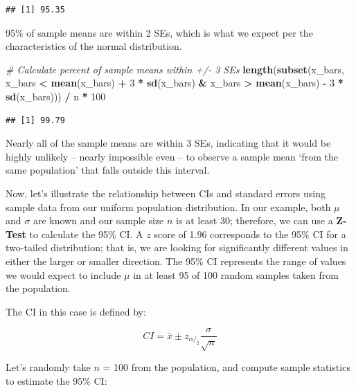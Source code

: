 \documentclass[]{book}
\newenvironment{Shaded}{\begin{snugshade}}{\end{snugshade}}
\newcommand{\CommentTok}[1]{\textcolor[rgb]{0.56,0.35,0.01}{\textit{#1}}}
\newcommand{\DecValTok}[1]{\textcolor[rgb]{0.00,0.00,0.81}{#1}}
\newcommand{\KeywordTok}[1]{\textcolor[rgb]{0.13,0.29,0.53}{\textbf{#1}}}
\newcommand{\NormalTok}[1]{#1}
\newcommand{\OperatorTok}[1]{\textcolor[rgb]{0.81,0.36,0.00}{\textbf{#1}}}
\newcommand{\StringTok}[1]{\textcolor[rgb]{0.31,0.60,0.02}{#1}}
\begin{document}
\begin{verbatim}
## [1] 95.35
\end{verbatim}

95\% of sample means are within 2 SEs, which is what we expect per the characteristics of the normal distribution.

\begin{Shaded}
\begin{Highlighting}[]
\CommentTok{# Calculate percent of sample means within +/- 3 SEs}
\KeywordTok{length}\NormalTok{(}\KeywordTok{subset}\NormalTok{(x_bars, x_bars }\OperatorTok{<}\StringTok{ }\KeywordTok{mean}\NormalTok{(x_bars) }\OperatorTok{+}\StringTok{ }\DecValTok{3} \OperatorTok{*}\StringTok{ }\KeywordTok{sd}\NormalTok{(x_bars) }\OperatorTok{&}\StringTok{ }\NormalTok{x_bars }\OperatorTok{>}\StringTok{ }\KeywordTok{mean}\NormalTok{(x_bars) }\OperatorTok{-}\StringTok{ }\DecValTok{3} \OperatorTok{*}\StringTok{ }\KeywordTok{sd}\NormalTok{(x_bars))) }\OperatorTok{/}\StringTok{ }\NormalTok{n }\OperatorTok{*}\StringTok{ }\DecValTok{100}
\end{Highlighting}
\end{Shaded}

\begin{verbatim}
## [1] 99.79
\end{verbatim}

Nearly all of the sample means are within 3 SEs, indicating that it would be highly unlikely -- nearly impossible even -- to observe a sample mean `from the same population' that falls outside this interval.

Now, let's illustrate the relationship between CIs and standard errors using sample data from our uniform population distribution. In our example, both \(\mu\) and \(\sigma\) are known and our sample size \(n\) is at least 30; therefore, we can use a \textbf{Z-Test} to calculate the 95\% CI. A \(z\) score of 1.96 corresponds to the 95\% CI for a two-tailed distribution; that is, we are looking for significantly different values in either the larger or smaller direction. The 95\% CI represents the range of values we would expect to include \(\mu\) in at least 95 of 100 random samples taken from the population.

The CI in this case is defined by:

\[ CI = \bar{x} \pm z_{\alpha/_2} \frac{\sigma}{\sqrt{n}} \]

Let's randomly take \(n\) = 100 from the population, and compute sample statistics to estimate the 95\% CI:
\end{document}
